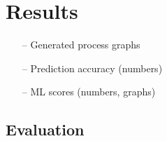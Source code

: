 \documentclass[english,12pt,a4paper,pdftex,sci,utf8]{aaltothesis}
\begin{document}



\clearpage
\section{Results}
\label{sec:results}


\begin{itemize}
\item[--]Generated process graphs
\item[--]Prediction accuracy (numbers)
\item[--]ML scores (numbers, graphs)
\end{itemize}

\clearpage
\subsection{Evaluation}
\label{sec:evaluation}



\end{document}
